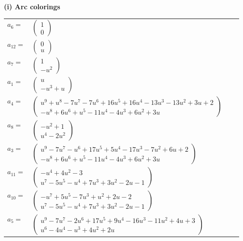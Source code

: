 \documentclass[1p]{elsarticle_modified}
\theoremstyle{definition}
\begin{document}
\flushleft \textbf{(i) Arc colorings}\\
\begin{tabular}{m{7pt} m{180pt} m{7pt} m{180pt} }
\flushright $a_{6}=$&$\begin{pmatrix}1\\0\end{pmatrix}$ \\
\flushright $a_{12}=$&$\begin{pmatrix}0\\u\end{pmatrix}$ \\
\flushright $a_{7}=$&$\begin{pmatrix}1\\- u^2\end{pmatrix}$ \\
\flushright $a_{1}=$&$\begin{pmatrix}u\\- u^3+u\end{pmatrix}$ \\
\flushright $a_{4}=$&$\begin{pmatrix}u^9+u^8-7 u^7-7 u^6+16 u^5+16 u^4-13 u^3-13 u^2+3 u+2\\- u^8+6 u^6+u^5-11 u^4-4 u^3+6 u^2+3 u\end{pmatrix}$ \\
\flushright $a_{8}=$&$\begin{pmatrix}- u^2+1\\u^4-2 u^2\end{pmatrix}$ \\
\flushright $a_{3}=$&$\begin{pmatrix}u^9-7 u^7- u^6+17 u^5+5 u^4-17 u^3-7 u^2+6 u+2\\- u^8+6 u^6+u^5-11 u^4-4 u^3+6 u^2+3 u\end{pmatrix}$ \\
\flushright $a_{11}=$&$\begin{pmatrix}- u^4+4 u^2-3\\u^7-5 u^5- u^4+7 u^3+3 u^2-2 u-1\end{pmatrix}$ \\
\flushright $a_{10}=$&$\begin{pmatrix}- u^7+5 u^5-7 u^3+u^2+2 u-2\\u^7-5 u^5- u^4+7 u^3+3 u^2-2 u-1\end{pmatrix}$ \\
\flushright $a_{5}=$&$\begin{pmatrix}u^9-7 u^7-2 u^6+17 u^5+9 u^4-16 u^3-11 u^2+4 u+3\\u^6-4 u^4- u^3+4 u^2+2 u\end{pmatrix}$ \\

\end{tabular}
\end{document}
